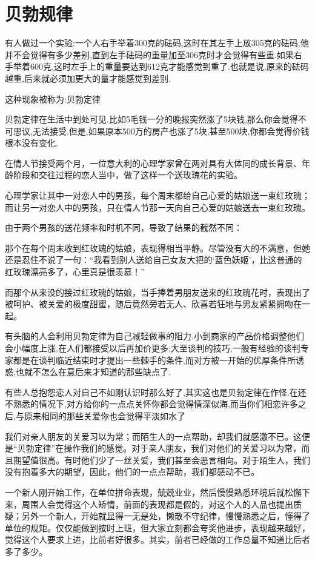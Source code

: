 \documentclass[11pt]{ctexart}
\begin{document}
\section{贝勃规律}
\label{sec-10}


有人做过一个实验:一个人右手举着300克的砝码,这时在其左手上放305克的砝码,他并不会觉得有多少差别,直到左手砝码的重量加至306克时才会觉得有些重.如果右手举着600克,这时左手上的重量要达到612克才能感觉到重了.也就是说,原来的砝码越重,后来就必须加更大的量才能感觉到差别.

这种现象被称为:贝勃定律

贝勃定律在生活中到处可见.比如5毛钱一分的晚报突然涨了5块钱,那么你会觉得不可思议,无法接受.但是,如果原本500万的房产也涨了5块,甚至500块,你都会觉得价钱根本没有变化.

在情人节接受两个月，一位意大利的心理学家曾在两对具有大体同的成长背景、年龄阶段和交往过程的恋人当中，做了这样一个送玫瑰花的实验。

心理学家让其中一对恋人中的男孩，每个周末都给自己心爱的姑娘送一束红玫瑰；而让另一对恋人中的男孩，只在情人节那一天向自己心爱的姑娘送去一束红玫瑰。

由于两个男孩的送花频率和时机不同，导致了结果的截然不同：

那个在每个周末收到红玫瑰的姑娘，表现得相当平静。尽管没有大的不满意，但她还是忍住不说了一句：“我看到别人送给自己女友大把的‘蓝色妖姬’，比这普通的红玫瑰漂亮多了，心里真是很羡慕！”

而那个从来没的接过红玫瑰的姑娘，当手捧着男朋友送来的红玫瑰花时，表现出了被呵护、被关爱的极度甜蜜，随后竟然旁若无人、欣喜若狂地与男友紧紧拥吻在一起。

有头脑的人会利用贝勃定律为自己减轻做事的阻力.小到商家的产品价格调整他们会小幅度上涨,在人们都接受以后再加价更多;大至谈判的技巧,一般有经验的谈判专家都是在谈判临近结束时才提出一些棘手的条件,而对方被一开始的优厚条件所诱惑,也就不怎么在意后来才知道的那些缺点了.

有些人总抱怨恋人对自己不如刚认识时那么好了,其实这也是贝勃定律在作怪.在还不熟悉的情况下,对方给你的一点点关怀你都会觉得情深似海,而当你们相恋许多之后,与原来相同的那些关爱你也会觉得平淡如水了

我们对亲人朋友的关爱习以为常；而陌生人的一点帮助，却我们就感激不已。这便是“贝勃定律”在操作我们的感觉。对于亲人朋友，我们对他们的关爱习以为常，而且期望值很高。有时他们少了一丝关爱，我们甚至会恶言相向。对于陌生人，我们没有抱着多大的期望，因此，他们的一点点帮助，我们都感动不已。

一个新人刚开始工作，在单位拼命表现，兢兢业业，然后慢慢熟悉环境后就松懈下来，周围人会觉得这个人矫情，前面的表现都是假的，对这个人的人品也提出质疑；另外一个新人，开始就显得一无是处，懒散不守纪律，慢慢熟悉之后，懂得了单位的规矩。仅仅能做到按时上班，但大家立刻都会夸奖他进步，表现越来越好，觉得这个人要求上进，比前者好很多。其实，前者已经做的工作总量不知道比后者多了多少。
\end{document}
